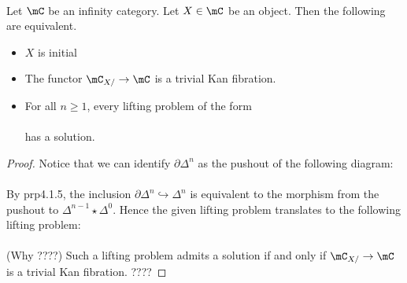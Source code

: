 \documentclass[a4paper]{article}
\begin{document}
\begin{prp}{}{}\\ Let $\mC$ be an infinity category. Let $X\in\mC$ be an object. Then the following are equivalent. 
\begin{itemize}
\item $X$ is initial
\item The functor $\mC_{X/}\to\mC$ is a trivial Kan fibration. 
\item For all $n\geq 1$, every lifting problem of the form \\
\\
has a solution. 
\end{itemize} 
\begin{proof}
Notice that we can identify $\partial\Delta^n$ as the pushout of the following diagram: \\
\\
By prp4.1.5, the inclusion $\partial\Delta^n\hookrightarrow\Delta^n$ is equivalent to the morphism from the pushout to $\Delta^{n-1}\star\Delta^0$. Hence the given lifting problem translates to the following lifting problem: \\
\\
(Why ????) Such a lifting problem admits a solution if and only if $\mC_{X/}\to\mC$ is a trivial Kan fibration. ????
\end{proof}
\end{prp}
\end{document}
